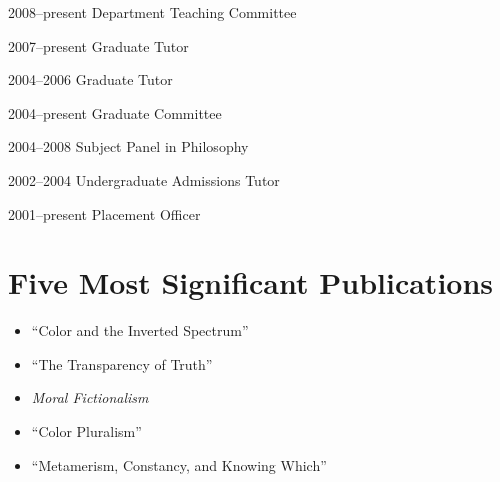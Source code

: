 \documentclass[contbibnum]{cv}
\begin{document}
\begin{topic}
	\item[2008--present] Department Teaching Committee
    \item[2007--present] Graduate Tutor
    \item[2004--2006] Graduate Tutor
    \item[2004--present] Graduate Committee
    \item[2004--2008] Subject Panel in Philosophy
    \item[2002--2004] Undergraduate Admissions Tutor
    \item[2001--present] Placement Officer
\end{topic}


\section{Five Most Significant Publications}\label{sec:five_most_significant_publications} %

\begin{itemize}
	\item ``Color and the Inverted Spectrum''
	\item ``The Transparency of Truth''
	\item \emph{Moral Fictionalism}
	\item ``Color Pluralism''
	\item ``Metamerism, Constancy, and Knowing Which''
\end{itemize}


\nocite{Kalderon:1987lr}
\nocite{Kalderon:1996fk}
\nocite{Kalderon:1997lr}
\nocite{Kalderon:2000qy}
\nocite{Kalderon:2001qf}
\nocite{Kalderon:2004lr}
\nocite{Kalderon:2005gz}
\nocite{Kalderon:2006tg}
\nocite{Kalderon:2008qy}
\nocite{Hilbert:2000on}
\nocite{Kalderon:2008ud}
\nocite{Kalderon:2008mi}
       
\nocite{Kalderon:2005lr}
       
\nocite{Kalderon:2007mr}
       
\nocite{Kalderon:2007lr}
\nocite{Kalderon:2007gk}
       
\nocite{Kalderon:2007fk}
\nocite{Kalderon:2007qy}
\nocite{Skiadas:2007lr}


% 
% 
% 
% 
\end{document}
